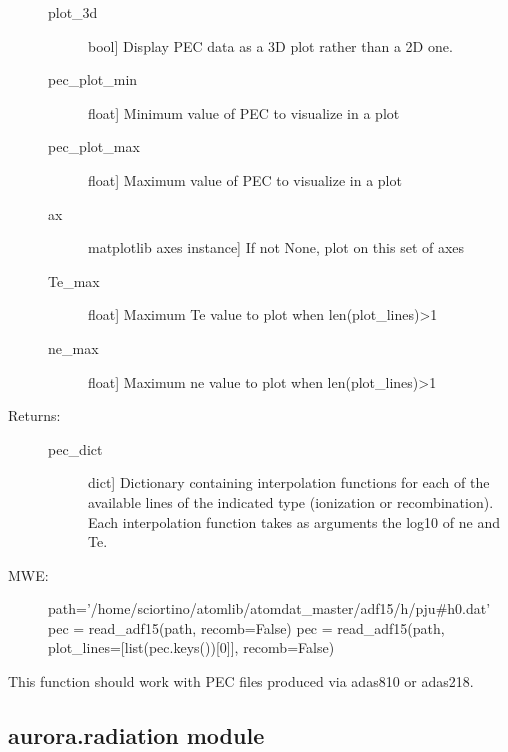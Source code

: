 \documentclass[letterpaper,10pt,english]{sphinxmanual}
\begin{document}
\begin{fulllineitems}
\begin{description}
\begin{description}
\item[{plot\_3d}] \leavevmode{[}bool{]}
Display PEC data as a 3D plot rather than a 2D one.

\item[{pec\_plot\_min}] \leavevmode{[}float{]}
Minimum value of PEC to visualize in a plot

\item[{pec\_plot\_max}] \leavevmode{[}float{]}
Maximum value of PEC to visualize in a plot

\item[{ax}] \leavevmode{[}matplotlib axes instance{]}
If not None, plot on this set of axes

\item[{Te\_max}] \leavevmode{[}float{]}
Maximum Te value to plot when len(plot\_lines)\textgreater{}1

\item[{ne\_max}] \leavevmode{[}float{]}
Maximum ne value to plot when len(plot\_lines)\textgreater{}1

\end{description}

\item[{Returns:}] \leavevmode\begin{description}
\item[{pec\_dict}] \leavevmode{[}dict{]}
Dictionary containing interpolation functions for each of the available lines of the
indicated type (ionization or recombination). Each interpolation function takes as arguments
the log\sphinxhyphen{}10 of ne and Te.

\end{description}

\item[{MWE:}] \leavevmode
path=’/home/sciortino/atomlib/atomdat\_master/adf15/h/pju\#h0.dat’
pec = read\_adf15(path, recomb=False)
pec = read\_adf15(path, plot\_lines={[}list(pec.keys()){[}0{]}{]}, recomb=False)

\end{description}

This function should work with PEC files produced via adas810 or adas218.

\end{fulllineitems}



\subsection{aurora.radiation module}
\label{\detokenize{aurora:module-aurora.radiation}}\label{\detokenize{aurora:aurora-radiation-module}}
\end{document}
